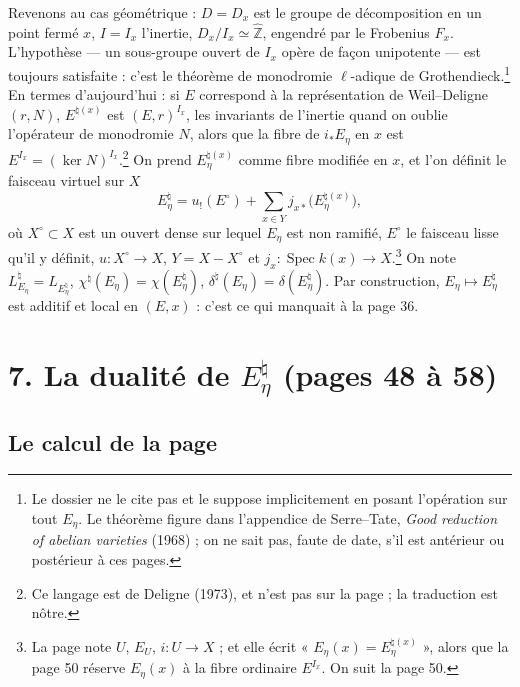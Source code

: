 \documentclass[11pt,a4paper]{article}
\begin{document}
Revenons au cas géométrique : $D = D_x$ est le groupe de décomposition en un
point fermé $x$, $I = I_x$ l'inertie, $D_x/I_x \simeq \hat{\mathbb{Z}}$,
engendré par le Frobenius $F_x$. L'hypothèse --- un sous-groupe ouvert de
$I_x$ opère de façon unipotente --- est toujours satisfaite : c'est le théorème
de monodromie $\ell$-adique de Grothendieck.\footnote{Le dossier ne le cite pas
et le suppose implicitement en posant l'opération sur tout $E_\eta$. Le
théorème figure dans l'appendice de Serre--Tate, \emph{Good reduction of abelian
varieties} (1968) ; on ne sait pas, faute de date, s'il est antérieur ou
postérieur à ces pages.} En termes d'aujourd'hui : si $E$ correspond à la
représentation de Weil--Deligne $(r, N)$, $E^{\natural(x)}$ est $(E, r)^{I_x}$,
les invariants de l'inertie quand on oublie l'opérateur de monodromie $N$, alors
que la fibre de $i_{*}E_\eta$ en $x$ est $E^{I_x} = (\ker N)^{I_x}$.\footnote{Ce
langage est de Deligne (1973), et n'est pas sur la page ; la traduction est
nôtre.} On prend $E_\eta^{\natural(x)}$ comme fibre modifiée en $x$, et l'on
définit le faisceau virtuel sur $X$
\[
  E_\eta^{\natural} = u_{!}(E^{\circ}) + \sum_{x \in Y} j_{x*}\bigl(E_\eta^{\natural(x)}\bigr),
\]
où $X^{\circ} \subset X$ est un ouvert dense sur lequel $E_\eta$ est non ramifié,
$E^{\circ}$ le faisceau lisse qu'il y définit, $u : X^{\circ} \to X$,
$Y = X - X^{\circ}$ et $j_x : \operatorname{Spec}k(x) \to X$.\footnote{La page
note $U$, $E_U$, $i : U \to X$ ; et elle écrit
« $E_\eta(x) = E_\eta^{\natural(x)}$ », alors que la page 50 réserve
$E_\eta(x)$ à la fibre ordinaire $E^{I_x}$. On suit la page 50.} On note
$L^{\natural}_{E_\eta} = L_{E_\eta^{\natural}}$,
$\chi^{\natural}(E_\eta) = \chi(E_\eta^{\natural})$,
$\delta^{\natural}(E_\eta) = \delta(E_\eta^{\natural})$. Par construction,
$E_\eta \mapsto E_\eta^{\natural}$ est additif et local en $(E, x)$ : c'est ce
qui manquait à la page 36.

\section*{7. La dualité de $E_\eta^{\natural}$ (pages 48 à 58)}

\subsection*{Le calcul de la page}
\end{document}
